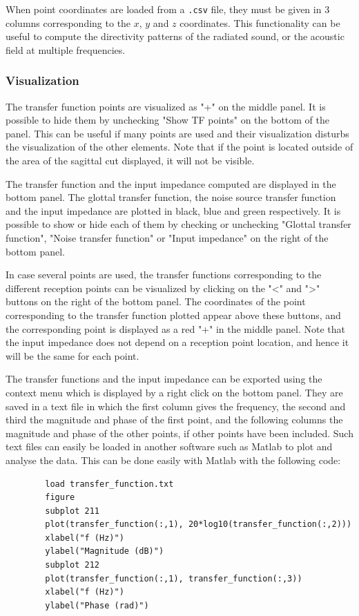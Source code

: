 \documentclass[]{article}
\begin{document}
	When point coordinates are loaded from a \texttt{.csv} file, they must be given
	in 3 columns corresponding to the $x$, $y$ and $z$ coordinates. 
	This functionality can be useful to compute the directivity patterns of the 
	radiated sound, or the acoustic field at multiple frequencies.
	
	\subsubsection{Visualization}
	
	The transfer function points are visualized as "+" on the middle panel.
	It is possible to hide them by unchecking "Show TF points" on the bottom of 
	the panel. This can be useful if many points are used and their visualization 
	disturbs the visualization of the other elements.
	Note that if the point is located outside of the area of the sagittal cut displayed,
	it will not be visible.
	
	The transfer function and the input impedance computed are displayed in the bottom panel.
	The glottal transfer function, the noise source transfer function and the input 
	impedance are plotted in black, blue and green respectively.
	It is possible to show or hide each of them by checking or unchecking 
	"Glottal transfer function", "Noise transfer function" or "Input impedance" on the 
	right of the bottom panel. 
	
	In case several points are used, 
	the transfer functions corresponding to the different reception points can be visualized
	by clicking on the "<" and ">" buttons on the right of the bottom panel.
	The coordinates of the point corresponding to the transfer function plotted appear above 
	these buttons, and the corresponding point is displayed as a red "+" in the middle panel.
	Note that the input impedance does not depend on a reception point location, and hence
	it will be the same for each point.
	
	The transfer functions and the input impedance can be exported using the context 
	menu which is displayed by a right click on the bottom panel. 
	They are saved in a text file in which the first column gives the frequency, 
	the second and third the magnitude and phase of the first point, and the following 
	columns the magnitude and phase of the other points, if other points have been included.
	Such text files can easily be loaded in another software such as Matlab to plot and 
	analyse the data.
	This can be done easily with Matlab with the following code:
	\begin{lstlisting}
		load transfer_function.txt
		figure
		subplot 211
		plot(transfer_function(:,1), 20*log10(transfer_function(:,2)))
		xlabel("f (Hz)")
		ylabel("Magnitude (dB)")
		subplot 212
		plot(transfer_function(:,1), transfer_function(:,3))
		xlabel("f (Hz)")
		ylabel("Phase (rad)")
	\end{lstlisting}
	
\end{document}
